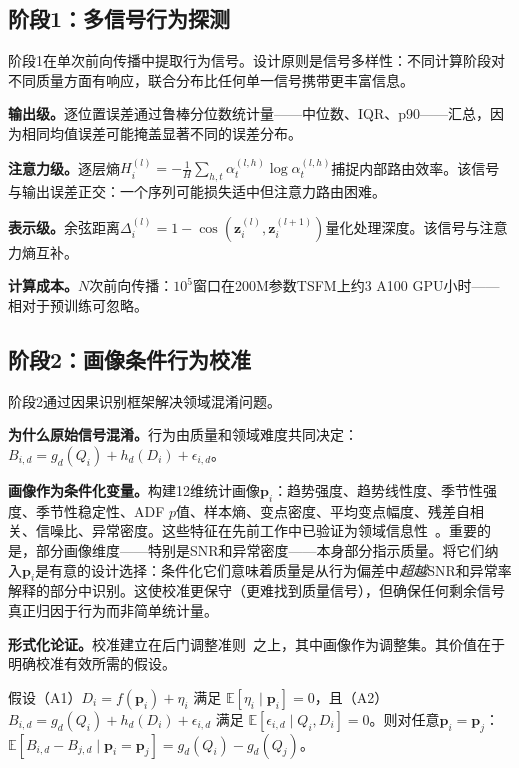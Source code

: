 \documentclass{article}
\begin{document}
\subsection{阶段1：多信号行为探测}

阶段1在单次前向传播中提取行为信号。设计原则是信号多样性：不同计算阶段对不同质量方面有响应，联合分布比任何单一信号携带更丰富信息。

\textbf{输出级。}逐位置误差通过鲁棒分位数统计量——中位数、IQR、p90——汇总，因为相同均值误差可能掩盖显著不同的误差分布。

\textbf{注意力级。}逐层熵$H_i^{(l)} = -\frac{1}{H}\sum_{h,t} \alpha_{t}^{(l,h)} \log \alpha_{t}^{(l,h)}$捕捉内部路由效率。该信号与输出误差正交：一个序列可能损失适中但注意力路由困难。

\textbf{表示级。}余弦距离$\Delta_i^{(l)} = 1 - \cos(\mathbf{z}_i^{(l)}, \mathbf{z}_i^{(l+1)})$量化处理深度。该信号与注意力熵互补。

\textbf{计算成本。}$N$次前向传播：$10^5$窗口在200M参数TSFM上约3 A100 GPU小时——相对于预训练可忽略。

\subsection{阶段2：画像条件行为校准}
\label{sec:calibration}

阶段2通过因果识别框架解决领域混淆问题。

\textbf{为什么原始信号混淆。}行为由质量和领域难度共同决定：$B_{i,d} = g_d(Q_i) + h_d(D_i) + \epsilon_{i,d}$。

\textbf{画像作为条件化变量。}构建12维统计画像$\mathbf{p}_i$：趋势强度、趋势线性度、季节性强度、季节性稳定性、ADF $p$值、样本熵、变点密度、平均变点幅度、残差自相关、信噪比、异常密度。这些特征在先前工作中已验证为领域信息性~\citep{forecastcore2026, wang2006characteristic}。重要的是，部分画像维度——特别是SNR和异常密度——本身部分指示质量。将它们纳入$\mathbf{p}_i$是有意的设计选择：条件化它们意味着质量是从行为偏差中\emph{超越}SNR和异常率解释的部分中识别。这使校准更保守（更难找到质量信号），但确保任何剩余信号真正归因于行为而非简单统计量。

\textbf{形式化论证。}校准建立在后门调整准则~\citep{pearl2009causality}之上，其中画像作为调整集。其价值在于明确校准有效所需的假设。

\begin{proposition}[条件质量可识别性]
\label{prop:identification}
假设（A1）$D_i = f(\mathbf{p}_i) + \eta_i$ 满足 $\mathbb{E}[\eta_i \mid \mathbf{p}_i] = 0$，且（A2）$B_{i,d} = g_d(Q_i) + h_d(D_i) + \epsilon_{i,d}$ 满足 $\mathbb{E}[\epsilon_{i,d} \mid Q_i, D_i] = 0$。则对任意$\mathbf{p}_i = \mathbf{p}_j$：$\mathbb{E}[B_{i,d} - B_{j,d} \mid \mathbf{p}_i = \mathbf{p}_j] = g_d(Q_i) - g_d(Q_j)$。
\end{proposition}
\end{document}
